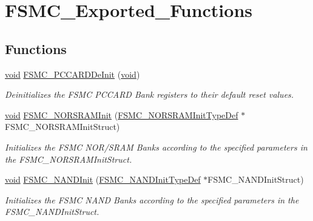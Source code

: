 \hypertarget{group___f_s_m_c___exported___functions}{}\section{F\+S\+M\+C\+\_\+\+Exported\+\_\+\+Functions}
\label{group___f_s_m_c___exported___functions}
\subsection*{Functions}
\begin{DoxyCompactItemize}
\item 
\hyperlink{usb__devapi_8h_afabf60e7f57651d6d595a02c75f07cd0}{void} \hyperlink{group___f_s_m_c___exported___functions_ga2f53ccf3a4f3c80a5a56fb47ccd47ccd}{F\+S\+M\+C\+\_\+\+P\+C\+C\+A\+R\+D\+De\+Init} (\hyperlink{usb__devapi_8h_afabf60e7f57651d6d595a02c75f07cd0}{void})
\begin{DoxyCompactList}\small\item\em Deinitializes the F\+S\+MC P\+C\+C\+A\+RD Bank registers to their default reset values. \end{DoxyCompactList}\item 
\hyperlink{usb__devapi_8h_afabf60e7f57651d6d595a02c75f07cd0}{void} \hyperlink{group___f_s_m_c___exported___functions_ga9c27816e8b17394c9ee1ce9298917b4a}{F\+S\+M\+C\+\_\+\+N\+O\+R\+S\+R\+A\+M\+Init} (\hyperlink{struct_f_s_m_c___n_o_r_s_r_a_m_init_type_def}{F\+S\+M\+C\+\_\+\+N\+O\+R\+S\+R\+A\+M\+Init\+Type\+Def} $\ast$F\+S\+M\+C\+\_\+\+N\+O\+R\+S\+R\+A\+M\+Init\+Struct)
\begin{DoxyCompactList}\small\item\em Initializes the F\+S\+MC N\+O\+R/\+S\+R\+AM Banks according to the specified parameters in the F\+S\+M\+C\+\_\+\+N\+O\+R\+S\+R\+A\+M\+Init\+Struct. \end{DoxyCompactList}\item 
\hyperlink{usb__devapi_8h_afabf60e7f57651d6d595a02c75f07cd0}{void} \hyperlink{group___f_s_m_c___exported___functions_ga9f81ccc4e126c11f1eb33077b1a68e6f}{F\+S\+M\+C\+\_\+\+N\+A\+N\+D\+Init} (\hyperlink{struct_f_s_m_c___n_a_n_d_init_type_def}{F\+S\+M\+C\+\_\+\+N\+A\+N\+D\+Init\+Type\+Def} $\ast$F\+S\+M\+C\+\_\+\+N\+A\+N\+D\+Init\+Struct)
\begin{DoxyCompactList}\small\item\em Initializes the F\+S\+MC N\+A\+ND Banks according to the specified parameters in the F\+S\+M\+C\+\_\+\+N\+A\+N\+D\+Init\+Struct. \end{DoxyCompactList}\item 

\end{DoxyCompactItemize}
